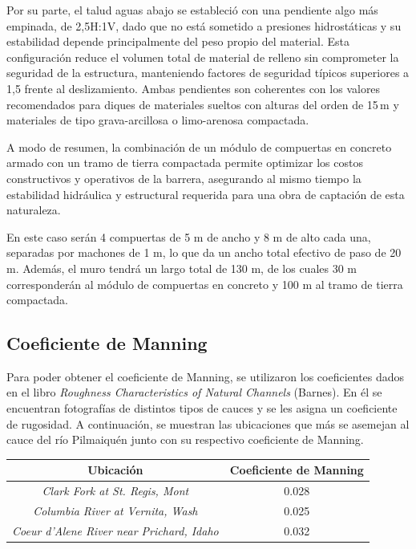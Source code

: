 \documentclass{article} %
\begin{document}
Por su parte, el talud aguas abajo se estableció con una pendiente algo más empinada, de 2{,}5H:1V, dado que no está sometido a presiones hidrostáticas y su estabilidad depende principalmente del peso propio del material. Esta configuración reduce el volumen total de material de relleno sin comprometer la seguridad de la estructura, manteniendo factores de seguridad típicos superiores a 1{,}5 frente al deslizamiento. Ambas pendientes son coherentes con los valores recomendados para diques de materiales sueltos con alturas del orden de 15\,m y materiales de tipo grava-arcillosa o limo-arenosa compactada.

A modo de resumen, la combinación de un módulo de compuertas en concreto armado con un tramo de tierra compactada permite optimizar los costos constructivos y operativos de la barrera, asegurando al mismo tiempo la estabilidad hidráulica y estructural requerida para una obra de captación de esta naturaleza.

En este caso serán 4 compuertas de 5 m de ancho y 8 m de alto cada una, separadas por machones de 1 m, lo que da un ancho total efectivo de paso de 20 m. Además, el muro tendrá un largo total de 130 m, de los cuales 30 m corresponderán al módulo de compuertas en concreto y 100 m al tramo de tierra compactada.

\subsection{Coeficiente de Manning}

Para poder obtener el coeficiente de Manning, se utilizaron los coeficientes dados en el libro \textit{Roughness Characteristics of Natural Channels} (Barnes). En él se encuentran fotografías de distintos tipos de cauces y se les asigna un coeficiente de rugosidad. A continuación, se muestran las ubicaciones que más se asemejan al cauce del río Pilmaiquén junto con su respectivo coeficiente de Manning.

\begin{table}[h!]
    \centering
    \begin{tabular}{c c}
        \textbf{Ubicación} & \textbf{Coeficiente de Manning} \\
        \hline
        \textit{Clark Fork at St. Regis, Mont} & 0.028 \\ 
        \textit{Columbia River at Vernita, Wash} & 0.025 \\
        \textit{Coeur d'Alene River near Prichard, Idaho} & 0.032 \\\hline
    \end{tabular}
\end{table}
\end{document}
